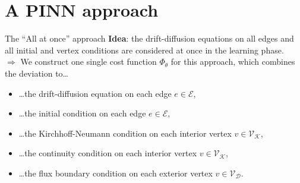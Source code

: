 \documentclass[9pt]{beamer}
\begin{document}
\section{A PINN approach}



\begin{frame}{The “All at once” approach}
    \textbf{Idea}: the drift-diffusion equations on all edges and all initial and vertex conditions are considered at once in the learning phase. \\
    \vspace{5mm}
    $\Rightarrow$ We construct one single cost function $\Phi_{\theta}$ for this approach, which combines the deviation to\dots
    \begin{itemize}
        \item \dots the drift-diffusion equation on each edge $e \in \mathcal{E}$,
        \item \dots the initial condition on each edge $e \in \mathcal{E}$,
        \item \dots the Kirchhoff-Neumann condition on each interior vertex $v \in \mathcal{V}_{\mathcal{K}}$,
        \item \dots the continuity condition on each interior vertex $v \in \mathcal{V}_{\mathcal{K}}$,
        \item \dots the flux boundary condition on each exterior vertex $v \in \mathcal{V}_{\mathcal{D}}$.
    \end{itemize} 
\end{frame}
\end{document}
